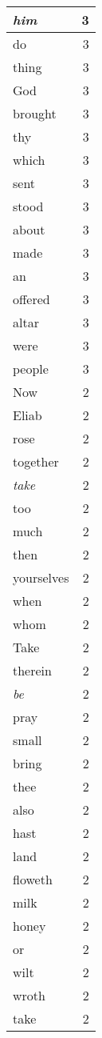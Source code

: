 \begin{center}
\begin{longtable}{l|r}
\emph{him} & 3 \\ \hline
do & 3 \\ \hline
thing & 3 \\ \hline
God & 3 \\ \hline
brought & 3 \\ \hline
thy & 3 \\ \hline
which & 3 \\ \hline
sent & 3 \\ \hline
stood & 3 \\ \hline
about & 3 \\ \hline
made & 3 \\ \hline
an & 3 \\ \hline
offered & 3 \\ \hline
altar & 3 \\ \hline
were & 3 \\ \hline
people & 3 \\ \hline
Now & 2 \\ \hline
Eliab & 2 \\ \hline
rose & 2 \\ \hline
together & 2 \\ \hline
\emph{take} & 2 \\ \hline
too & 2 \\ \hline
much & 2 \\ \hline
then & 2 \\ \hline
yourselves & 2 \\ \hline
when & 2 \\ \hline
whom & 2 \\ \hline
Take & 2 \\ \hline
therein & 2 \\ \hline
\emph{be} & 2 \\ \hline
pray & 2 \\ \hline
small & 2 \\ \hline
bring & 2 \\ \hline
thee & 2 \\ \hline
also & 2 \\ \hline
hast & 2 \\ \hline
land & 2 \\ \hline
floweth & 2 \\ \hline
milk & 2 \\ \hline
honey & 2 \\ \hline
or & 2 \\ \hline
wilt & 2 \\ \hline
wroth & 2 \\ \hline
take & 2 \\ \hline

\end{longtable}
\end{center}
